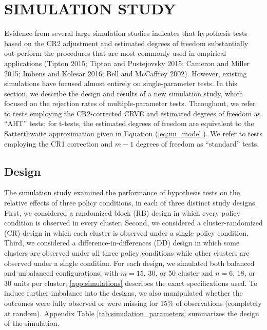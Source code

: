 \documentclass[12pt]{article}
\begin{document}
\hypertarget{sec:simulation}{%
\section{SIMULATION STUDY}\label{sec:simulation}}

Evidence from several large simulation studies indicates that hypothesis
tests based on the CR2 adjustment and estimated degrees of freedom
substantially out-perform the procedures that are most commonly used in
empirical applications (Tipton 2015; Tipton and Pustejovsky 2015;
Cameron and Miller 2015; Imbens and Kolesar 2016; Bell and McCaffrey
2002). However, existing simulations have focused almost entirely on
single-parameter tests. In this section, we describe the design and
results of a new simulation study, which focused on the rejection rates
of multiple-parameter tests. Throughout, we refer to tests employing the
CR2-corrected CRVE and estimated degrees of freedom as ``AHT'' tests;
for t-tests, the estimated degrees of freedom are equivalent to the
Satterthwaite approximation given in Equation (\ref{eq:nu_model}). We
refer to tests employing the CR1 correction and \(m - 1\) degrees of
freedom as ``standard'' tests.

\hypertarget{design}{%
\subsection{Design}\label{design}}

The simulation study examined the performance of hypothesis tests on the
relative effects of three policy conditions, in each of three distinct
study designs. First, we considered a randomized block (RB) design in
which every policy condition is observed in every cluster. Second, we
considered a cluster-randomized (CR) design in which each cluster is
observed under a single policy condition. Third, we considered a
difference-in-differences (DD) design in which some clusters are
observed under all three policy conditions while other clusters are
observed under a single condition. For each design, we simulated both
balanced and unbalanced configurations, with \(m = 15\), 30, or 50
cluster and \(n = 6\), 18, or 30 units per cluster;
\ref{app:simulations} describes the exact specifications used. To induce
further imbalance into the designs, we also manipulated whether the
outcomes were fully observed or were missing for 15\% of observations
(completely at random). Appendix Table \ref{tab:simulation_parameters}
summarizes the design of the simulation.
\end{document}
